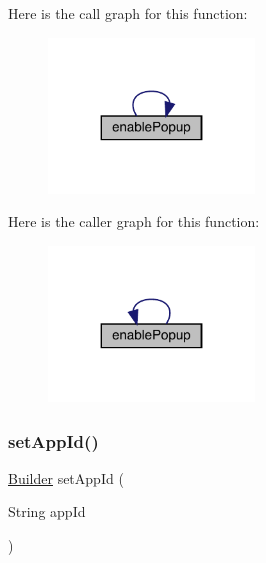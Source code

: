 Here is the call graph for this function\+:\nopagebreak
\begin{figure}[H]
\begin{center}
\leavevmode
\includegraphics[width=155pt]{classcom_1_1toast_1_1android_1_1gamebase_1_1_gamebase_configuration_1_1_builder_a5b53589024bfbfc126c7f621ee0c2722_cgraph}
\end{center}
\end{figure}
Here is the caller graph for this function\+:\nopagebreak
\begin{figure}[H]
\begin{center}
\leavevmode
\includegraphics[width=155pt]{classcom_1_1toast_1_1android_1_1gamebase_1_1_gamebase_configuration_1_1_builder_a5b53589024bfbfc126c7f621ee0c2722_icgraph}
\end{center}
\end{figure}
\mbox{\label{classcom_1_1toast_1_1android_1_1gamebase_1_1_gamebase_configuration_1_1_builder_a7a01a2201adac0aa638800cdd12da4cf}} 
\subsubsection{\texorpdfstring{set\+App\+Id()}{setAppId()}}
{\footnotesize\ttfamily \hyperlink{classcom_1_1toast_1_1android_1_1gamebase_1_1_gamebase_configuration_1_1_builder}{Builder} set\+App\+Id (\begin{DoxyParamCaption}\item[{String}]{app\+Id }\end{DoxyParamCaption})}

